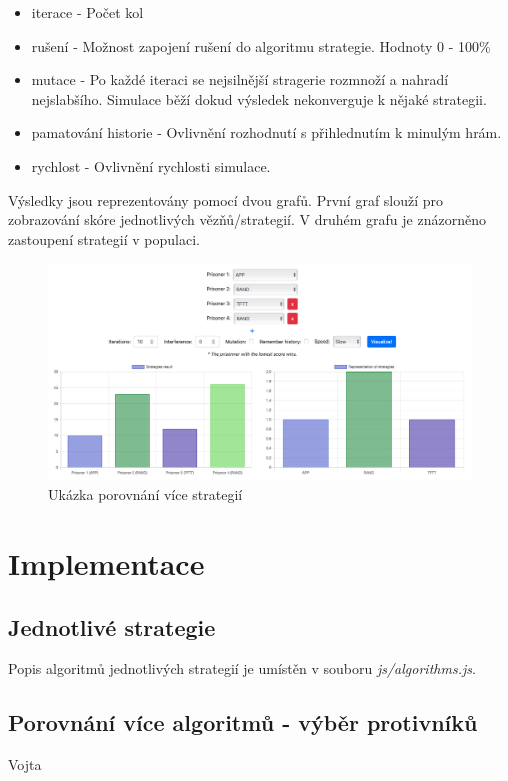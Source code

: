 \documentclass[12pt, a4paper]{article}
\begin{document}
\begin{itemize}
  \item iterace - Počet kol
  \item rušení - Možnost zapojení rušení do algoritmu strategie. Hodnoty 0 - 100\%
  \item mutace - Po každé iteraci se nejsilnější stragerie rozmnoží a nahradí nejslabšího. Simulace běží dokud výsledek nekonverguje k nějaké strategii.
  \item pamatování historie - Ovlivnění rozhodnutí s přihlednutím k minulým hrám.
  \item rychlost - Ovlivnění rychlosti simulace.
\end{itemize}

Výsledky jsou reprezentovány pomocí dvou grafů. První graf slouží pro zobrazování skóre jednotlivých vězňů/strategií. V druhém grafu je znázorněno zastoupení strategií v populaci.

\begin{figure}[!h]
  \centering
  \includegraphics[scale=0.3]{img/iter.png}
  \caption{Ukázka porovnání více strategií}
\end{figure}
\newpage

\section{Implementace}
\subsection{Jednotlivé strategie}
\noindent Popis algoritmů jednotlivých strategií je umístěn v souboru \textit{js/algorithms.js}.

\subsection{Porovnání více algoritmů - výběr protivníků}
Vojta
\end{document}
